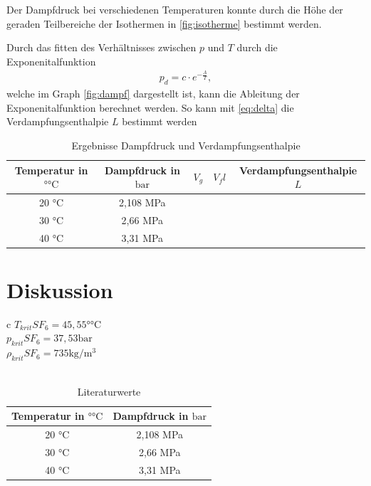 \documentclass[11pt, a4paper]{article}
\begin{document}
    Der Dampfdruck bei verschiedenen Temperaturen konnte durch die Höhe der geraden Teilbereiche
    der Isothermen in \ref{fig:isotherme} bestimmt werden.
    

    Durch das fitten des Verhältnisses zwischen $p$ und $T$ durch die Exponenitalfunktion
    \begin{align}
        p_d = c \cdot e^{-\frac{A}{T}},
    \end{align}
    welche im Graph \ref{fig:dampf} dargestellt ist,
    kann die Ableitung der Exponenitalfunktion berechnet werden. So kann mit \ref{eq:delta}
    die Verdampfungsenthalpie $L$ bestimmt werden
    \begin{table}
        \centering
        \begin{tabular}{c c c c c}
            Temperatur in $\si{\degree\celsius}$ & Dampfdruck in $\si{\bar}$ & $V_g$ & $V_fl$ & Verdampfungsenthalpie $L$ \\ \hline
            20 \si{\celsius} & 2,108 \si{\mega\pascal} \\
            30 \si{\celsius} & 2,66 \si{\mega\pascal} \\
            40 \si{\celsius} & 3,31 \si{\mega\pascal} \\
        \end{tabular}
        \label{tab:dampfmess}
        \caption{Ergebnisse Dampfdruck und Verdampfungsenthalpie}
    \end{table}
    \section{Diskussion}
    \begin{table}
        \centering
        \begin{tabular}{c}
            $T_{krit} SF_6 = 45,55 \si{\degree \celsius}$ \cite{SH6} \\
            $p_{krit} SF_6 = 37,53 \si{\bar}$ \cite{SH6} \\
            $\rho_{krit} SF_6 = 735 \si{\kilogram \per \meter \cubed}$ \cite{SH6} \\
            \\
            \begin{tabular}{c c}
                Temperatur in $\si{\degree\celsius}$ & Dampfdruck in $\si{\bar}$ \\ \hline
                20 \si{\celsius} & 2,108 \si{\mega\pascal} \\
                30 \si{\celsius} & 2,66 \si{\mega\pascal} \\
                40 \si{\celsius} & 3,31 \si{\mega\pascal} \\
            \end{tabular}
        \end{tabular}
        \caption{Literaturwerte}
        \label{tab:literaturwerte}
    \end{table}


    
    
\end{document}
